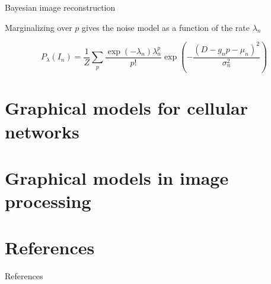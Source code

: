 \documentclass{beamer}					%
\begin{document}
\begin{frame}{Bayesian image reconstruction}

Marginalizing over $p$ gives the noise model as a function of the rate $\lambda_{n}$

\begin{equation*}
P_{\lambda}(I_{n}) = \frac{1}{Z}\sum_{p}\frac{\exp\left({-\lambda_{n}}\right)\lambda_{n}^{p}}{p!}\exp\left(-\frac{(D-g_{n}p-\mu_{n})^{2}}{\sigma_{n}^{2}}\right)
\end{equation*}



\end{frame}




\section{Graphical models for cellular networks}




\section{Graphical models in image processing}



\section{References}

\begin{frame}[allowframebreaks]{References}
	\tiny
	
\end{frame}
\end{document}
